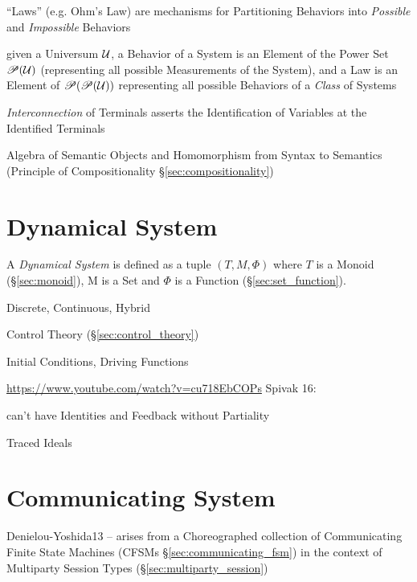 
``Laws'' (e.g. Ohm's Law) are mechanisms for Partitioning Behaviors
into \emph{Possible} and \emph{Impossible} Behaviors

given a Universum $\mathcal{U}$, a Behavior of a System is an Element
of the Power Set $\mathscr{P}(\mathcal{U})$ (representing all possible
Measurements of the System), and a Law is an Element of
$\mathscr{P}(\mathscr{P}(\mathcal{U}))$ representing all possible Behaviors of a
\emph{Class} of Systems

\emph{Interconnection} of Terminals asserts the Identification of
Variables at the Identified Terminals

Algebra of Semantic Objects and Homomorphism from Syntax to Semantics
(Principle of Compositionality \S\ref{sec:compositionality})



\section{Dynamical System}\label{sec:dynamical_system}

A \emph{Dynamical System} is defined as a tuple $(T,M,\Phi)$ where $T$
is a Monoid (\S\ref{sec:monoid}), M is a Set and $\Phi$ is a Function
(\S\ref{sec:set_function}).

Discrete, Continuous, Hybrid

Control Theory (\S\ref{sec:control_theory})

Initial Conditions, Driving Functions


\url{https://www.youtube.com/watch?v=cu718EbCOPs} Spivak 16:

can't have Identities and Feedback without Partiality %

Traced Ideals %



\section{Communicating System}\label{sec:communicating_system}

Denielou-Yoshida13 -- arises from a Choreographed collection of
Communicating Finite State Machines (CFSMs
\S\ref{sec:communicating_fsm}) in the context of Multiparty Session
Types (\S\ref{sec:multiparty_session})

